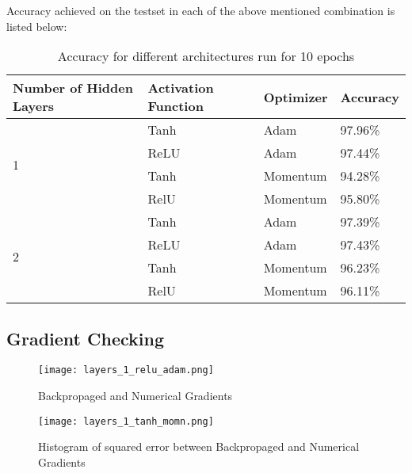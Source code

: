 \documentclass{article}
\begin{document}
    Accuracy achieved on the testset in each of the above mentioned combination is listed below:
    \begin{table}[h!]
      \centering
      \begin{tabular}[h]{|l | l | l | l|}
        \hline
        \textbf{Number of Hidden Layers} & \textbf{Activation Function} & \textbf{Optimizer} & \textbf{Accuracy}\\
        \hline
        \multirow{4}{*}{1}  & Tanh & Adam     & 97.96\%\\
                            & ReLU & Adam     & 97.44\%\\
                            & Tanh & Momentum & 94.28\%\\
                            & RelU & Momentum & 95.80\%\\
        \hline
        \multirow{4}{*}{2}  & Tanh & Adam     & 97.39\%\\
                            & ReLU & Adam     & 97.43\%\\
                            & Tanh & Momentum & 96.23\%\\
                            & RelU & Momentum & 96.11\%\\
        \hline

      \end{tabular}
      \caption{Accuracy for different architectures run for 10 epochs}
    \end{table}

    \subsection{Gradient Checking}
    \begin{figure}[h!]
      \centering
      \texttt{[image: layers\_1\_relu\_adam.png]}
      \caption{Backpropaged and Numerical Gradients}
    \end{figure}
    \begin{figure}[h!]
      \centering
      \texttt{[image: layers\_1\_tanh\_momn.png]}
      \caption{Histogram of squared error between Backpropaged and Numerical Gradients}
    \end{figure}
\end{document}
